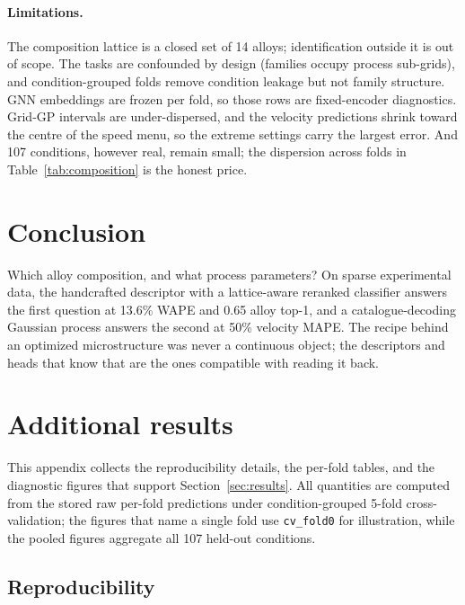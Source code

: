 \documentclass{article}
\newcommand{\needref}[1]{{\color{red}\textbf{[REF: #1]}}}
\begin{document}
\paragraph{Limitations.} The composition lattice is a closed set of 14 alloys;
identification outside it is out of scope. The tasks are confounded by design
(families occupy process sub-grids), and condition-grouped folds remove
condition leakage but not family structure. GNN embeddings are frozen per fold,
so those rows are fixed-encoder diagnostics. Grid-GP intervals are
under-dispersed, and the velocity predictions shrink toward the centre of the
speed menu, so the extreme settings carry the largest error. And 107
conditions, however real, remain small; the dispersion across folds in
Table~\ref{tab:composition} is the honest price.

\section{Conclusion}

Which alloy composition, and what process parameters? On sparse experimental
data, the handcrafted descriptor with a lattice-aware reranked classifier
answers the first question at 13.6\% WAPE and 0.65 alloy top-1, and a
catalogue-decoding Gaussian process answers the second at 50\% velocity MAPE.
The recipe behind an optimized microstructure was never a continuous object;
the descriptors and heads that know that are the ones compatible with reading
it back.




\appendix
\section{Additional results}
\label{app:results}

This appendix collects the reproducibility details, the per-fold tables, and
the diagnostic figures that support Section~\ref{sec:results}. All quantities
are computed from the stored raw per-fold predictions under condition-grouped
5-fold cross-validation; the figures that name a single fold use
\texttt{cv\_fold0} for illustration, while the pooled figures aggregate all
107 held-out conditions.

\subsection{Reproducibility}
\label{sec:repro}
\end{document}
